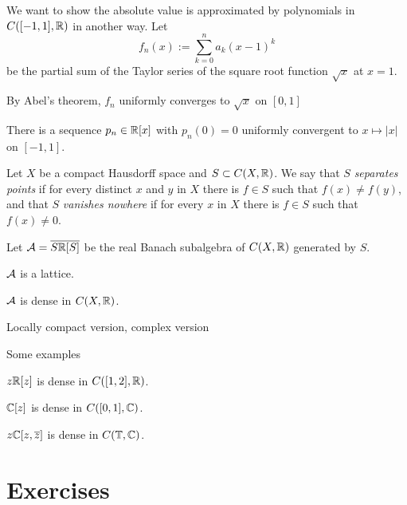 \documentclass{../../large}
\begin{document}
\begin{prb}
We want to show the absolute value is approximated by polynomials in $C([-1,1],\mathbb{R})$ in another way.
Let
\[f_n(x):=\sum_{k=0}^n a_k(x-1)^k\]
be the partial sum of the Taylor series of the square root function $\sqrt x$ at $x=1$.
\begin{parts}
\item By Abel's theorem, $f_n$ uniformly converges to $\sqrt x$ on $[0,1]$
\item There is a sequence $p_n\in\mathbb{R}[x]$ with $p_n(0)=0$ uniformly convergent to $x\mapsto|x|$ on $[-1,1]$.
\end{parts}
\end{prb}


\begin{prb}
Let $X$ be a compact Hausdorff space and $S\subset C(X,\mathbb{R})$.
We say that $S$ \emph{separates points} if for every distinct $x$ and $y$ in $X$ there is $f\in S$ such that $f(x)\ne f(y)$, and that $S$ \emph{vanishes nowhere} if for every $x$ in $X$ there is $f\in S$ such that $f(x)\ne0$.

Let $\mathcal{A}=\overline{S\mathbb{R}[S]}$ be the real Banach subalgebra of $C(X,\mathbb{R})$ generated by $S$.
\begin{parts}
\item $\mathcal{A}$ is a lattice.
\item $\mathcal{A}$ is dense in $C(X,\mathbb{R})$.
\end{parts}
\end{prb}




Locally compact version,
complex version








\begin{prb}
Some examples
\begin{parts}
\item $z\mathbb{R}[z]$ is dense in $C([1,2],\mathbb{R})$.
\item $\mathbb{C}[z]$ is dense in $C([0,1],\mathbb{C})$.
\item $z\mathbb{C}[z,\overline z]$ is dense in $C(\mathbb{T},\mathbb{C})$.
\end{parts}
\end{prb}







\section*{Exercises}
\begin{prb}
\end{prb}
\end{document}
